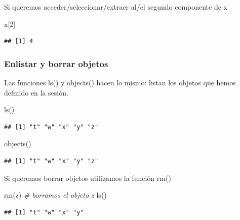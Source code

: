 \documentclass[
]{book}
\newenvironment{Shaded}{\begin{snugshade}}{\end{snugshade}}
\newcommand{\CommentTok}[1]{\textcolor[rgb]{0.56,0.35,0.01}{\textit{#1}}}
\newcommand{\DecValTok}[1]{\textcolor[rgb]{0.00,0.00,0.81}{#1}}
\newcommand{\FunctionTok}[1]{\textcolor[rgb]{0.00,0.00,0.00}{#1}}
\newcommand{\NormalTok}[1]{#1}
\begin{document}
Si queremos acceder/seleccionar/extraer al/el segundo componente de x

\begin{Shaded}
\begin{Highlighting}[]
\NormalTok{x[}\DecValTok{2}\NormalTok{]}
\end{Highlighting}
\end{Shaded}

\begin{verbatim}
## [1] 4
\end{verbatim}

\hypertarget{enlistar-y-borrar-objetos}{%
\subsubsection{Enlistar y borrar objetos}\label{enlistar-y-borrar-objetos}}

Las funciones ls() y objects() hacen lo mismo: listan los objetos que hemos definido en la sesión.

\begin{Shaded}
\begin{Highlighting}[]
\FunctionTok{ls}\NormalTok{()}
\end{Highlighting}
\end{Shaded}

\begin{verbatim}
## [1] "t" "w" "x" "y" "z"
\end{verbatim}

\begin{Shaded}
\begin{Highlighting}[]
\FunctionTok{objects}\NormalTok{()}
\end{Highlighting}
\end{Shaded}

\begin{verbatim}
## [1] "t" "w" "x" "y" "z"
\end{verbatim}

Si queremos borrar objetos utilizamos la función rm()

\begin{Shaded}
\begin{Highlighting}[]
\FunctionTok{rm}\NormalTok{(z)  }\CommentTok{\# borramos el objeto z}
\FunctionTok{ls}\NormalTok{()}
\end{Highlighting}
\end{Shaded}

\begin{verbatim}
## [1] "t" "w" "x" "y"
\end{verbatim}
\end{document}
